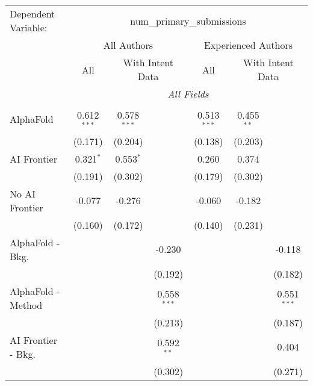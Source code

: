 \begingroup
\centering
\begin{tabular}{lcccccc}
   \tabularnewline \midrule \midrule
   Dependent Variable: & \multicolumn{6}{c}{num\_primary\_submissions}\\
 & \multicolumn{3}{c}{All Authors} & \multicolumn{3}{c}{Experienced Authors} \\
\cmidrule(lr){2-4} \cmidrule(lr){5-7}
 & \multicolumn{1}{c}{All} & \multicolumn{2}{c}{With Intent Data} & \multicolumn{1}{c}{All} & \multicolumn{2}{c}{With Intent Data} \\
\cmidrule(lr){2-2} \cmidrule(lr){3-4} \cmidrule(lr){5-5} \cmidrule(lr){6-7}
 & \multicolumn{6}{c}{\textit{All Fields}} \\ \\
   AlphaFold               & 0.612$^{***}$ & 0.578$^{***}$ &               & 0.513$^{***}$ & 0.455$^{**}$ &   \\   
                           & (0.171)       & (0.204)       &               & (0.138)       & (0.203)      &   \\   
   AI Frontier             & 0.321$^{*}$   & 0.553$^{*}$   &               & 0.260         & 0.374        &   \\   
                           & (0.191)       & (0.302)       &               & (0.179)       & (0.302)      &   \\   
   No AI Frontier          & -0.077        & -0.276        &               & -0.060        & -0.182       &   \\   
                           & (0.160)       & (0.172)       &               & (0.140)       & (0.231)      &   \\   
   AlphaFold - Bkg.        &               &               & -0.230        &               &              & -0.118\\   
                           &               &               & (0.192)       &               &              & (0.182)\\   
   AlphaFold - Method      &               &               & 0.558$^{***}$ &               &              & 0.551$^{***}$\\   
                           &               &               & (0.213)       &               &              & (0.187)\\   
   AI Frontier - Bkg.      &               &               & 0.592$^{**}$  &               &              & 0.404\\   
                           &               &               & (0.302)       &               &              & (0.271)\\   

\end{tabular}
